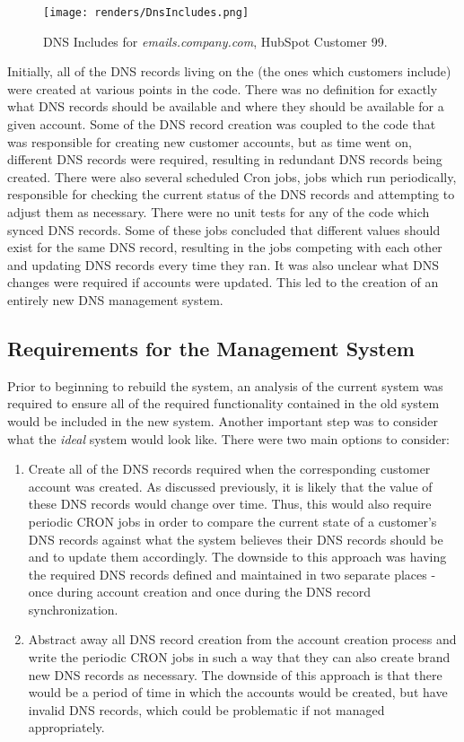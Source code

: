 \begin{figure}[H]
      \centering
      \texttt{[image: renders/DnsIncludes.png]}
      \caption{DNS Includes for \textit{emails.company.com}, HubSpot Customer 99.}
      \label{fig:dnsIncludes}
\end{figure}

Initially, all of the DNS records living on the  (the ones which customers include) were created at various points in the code. There was no definition for exactly what DNS records should be available and where they should be available for a given account. Some of the DNS record creation was coupled to the code that was responsible for creating new customer accounts, but as time went on, different DNS records were required, resulting in redundant DNS records being created. There were also several scheduled Cron jobs, jobs which run periodically, responsible for checking the current status of the DNS records and attempting to adjust them as necessary. There were no unit tests for any of the code which synced DNS records. Some of these jobs concluded that different values should exist for the same DNS record, resulting in the jobs competing with each other and updating DNS records every time they ran. It was also unclear what DNS changes were required if accounts were updated. This led to the creation of an entirely new DNS management system.


\subsection{Requirements for the Management System}
Prior to beginning to rebuild the system, an analysis of the current system was required to ensure all of the required functionality contained in the old system would be included in the new system. Another important step was to consider what the \textit{ideal} system would look like. There were two main options to consider:

\begin{enumerate}
    \item{Create all of the DNS records required when the corresponding customer account was created. As discussed previously, it is likely that the value of these DNS records would change over time. Thus, this would also require periodic CRON jobs in order to compare the current state of a customer's DNS records against what the system believes their DNS records should be and to update them accordingly. The downside to this approach was having the required DNS records defined and maintained in two separate places - once during account creation and once during the DNS record synchronization.}
    \item{Abstract away all DNS record creation from the account creation process and write the periodic CRON jobs in such a way that they can also create brand new DNS records as necessary. The downside of this approach is that there would be a period of time in which the accounts would be created, but have invalid DNS records, which could be problematic if not managed appropriately.}  
\end{enumerate}


